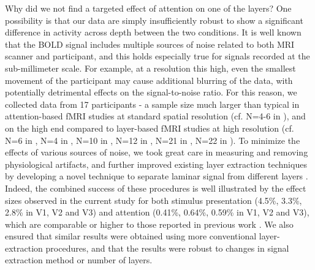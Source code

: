 \documentclass[9pt,lineno]{aperture}
\begin{document}
Why did we not find a targeted effect of attention on one of the layers? One possibility is that our data are simply insufficiently robust to show a significant difference in activity across depth between the two conditions. It is well known that the BOLD signal includes multiple sources of noise related to both MRI scanner and participant, and this holds especially true for signals recorded at the sub-millimeter scale. For example, at a resolution this high, even the smallest movement of the participant may cause additional blurring of the data, with potentially detrimental effects on the signal-to-noise ratio. For this reason, we collected data from 17 participants - a sample size much larger than typical in attention-based fMRI studies at standard spatial resolution (cf. N=4-6 in \citet{Kastner1999,Kamitani2005,Jehee2011}), and on the high end compared to layer-based fMRI studies at high resolution (cf. N=6 in \citet{Polimeni2010}, N=4 in \citet{Muckli2015}, N=10 in \citet{Kok2016}, N=12 in \citep{Klein2018}, N=21 in \citep{Lawrence2018}, N=22 in \citep{Sharoh2019}). To minimize the effects of various sources of noise, we took great care in measuring and removing physiological artifacts, and further improved existing layer extraction techniques by developing a novel technique to separate laminar signal from different layers \citep{VanMourik2019}. Indeed, the combined success of these procedures is well illustrated by the effect sizes observed in the current study for both stimulus presentation (4.5\%, 3.3\%, 2.8\% in V1, V2 and V3) and attention (0.41\%, 0.64\%, 0.59\% in V1, V2 and V3), which are comparable or higher to those reported in previous work \citep{Murray2008,Jehee2011}. We also ensured that similar results were obtained using more conventional layer-extraction procedures, and that the results were robust to changes in signal extraction method or number of layers. 
\end{document}
